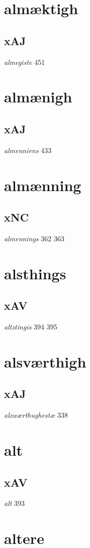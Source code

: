\documentclass[a4paper,twocolumn]{article}
\begin{document}
\section{almæktigh}
\label{sec:org46c24a3}
\subsection{xAJ}
\label{sec:org55cce42}
\emph{almegiste} 451 
\section{almænigh}
\label{sec:org691d88c}
\subsection{xAJ}
\label{sec:orga9b0dff}
\emph{almenniens} 433 
\section{almænning}
\label{sec:org4452b66}
\subsection{xNC}
\label{sec:org3f98cdd}
\emph{almennings} 362 363 
\section{alsthings}
\label{sec:org29fd6a7}
\subsection{xAV}
\label{sec:org971d6c4}
\emph{altztingis} 394 395 
\section{alsværthigh}
\label{sec:org0124075}
\subsection{xAJ}
\label{sec:orgdfcae52}
\emph{alzwærthughestæ} 338 
\section{alt}
\label{sec:orgfb9d116}
\subsection{xAV}
\label{sec:org0d20fda}
\emph{alt} 393 
\section{altere}
\label{sec:org7372e8e}
\end{document}

